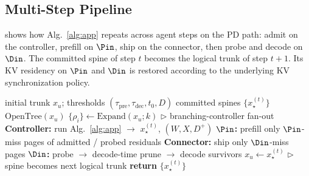 \subsection{Multi-Step Pipeline}
\label{sec:pipeline}
 shows how Alg.~\ref{alg:app} repeats across agent steps on the PD path: admit on the controller, prefill on $\Pin$, ship on the connector, then probe and decode on $\Din$.
The committed spine of step $t$ becomes the logical trunk of step $t{+}1$.
Its KV residency on $\Pin$ and $\Din$ is restored according to the underlying KV synchronization policy.

\begin{algorithm}[t]
\caption{\sys{} multi-step pipeline.
Each step invokes Alg.~\ref{alg:app}.}
\label{alg:pipeline}
\small
\begin{algorithmic}[1]
\REQUIRE initial trunk $x_u$; thresholds $(\tau_{\mathrm{pre}},\tau_{\mathrm{dec}},t_0,D)$
\ENSURE committed spines $\{x_\star^{(t)}\}$
\STATE $\mathrm{OpenTree}(x_u)$
  \STATE $\{\rho_i\}\leftarrow\mathrm{Expand}(x_u;k)$ \hfill \(\triangleright\) branching-controller fan-out
  \STATE \textbf{Controller:} run Alg.~\ref{alg:app} $\to$ $x_\star^{(t)}$, $(W,X,D^{+})$
  \STATE \textbf{$\Pin$:} prefill only $\Pin$-miss pages of admitted / probed residuals
  \STATE \textbf{Connector:} ship only $\Din$-miss pages
  \STATE \textbf{$\Din$:} probe $\to$ decode-time prune $\to$ decode survivors
  \STATE $x_u\leftarrow x_\star^{(t)}$ \hfill \(\triangleright\) spine becomes next logical trunk
\ENDFOR
\STATE \textbf{return} $\{x_\star^{(t)}\}$
\end{algorithmic}
\end{algorithm}
